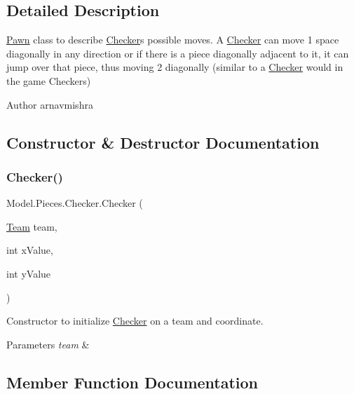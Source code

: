 \subsection{Detailed Description}
\hyperlink{class_model_1_1_pieces_1_1_pawn}{Pawn} class to describe \hyperlink{class_model_1_1_pieces_1_1_checker}{Checker}\textquotesingle{}s possible moves. A \hyperlink{class_model_1_1_pieces_1_1_checker}{Checker} can move 1 space diagonally in any direction or if there is a piece diagonally adjacent to it, it can jump over that piece, thus moving 2 diagonally (similar to a \hyperlink{class_model_1_1_pieces_1_1_checker}{Checker} would in the game Checkers) \begin{DoxyAuthor}{Author}
arnavmishra 
\end{DoxyAuthor}


\subsection{Constructor \& Destructor Documentation}
\hypertarget{class_model_1_1_pieces_1_1_checker_af2b456d3e6c3ceff5a641fac1928fd5a}{}\label{class_model_1_1_pieces_1_1_checker_af2b456d3e6c3ceff5a641fac1928fd5a} 
\subsubsection{\texorpdfstring{Checker()}{Checker()}}
{\footnotesize\ttfamily Model.\+Pieces.\+Checker.\+Checker (\begin{DoxyParamCaption}\item[{\hyperlink{class_model_1_1_team}{Team}}]{team,  }\item[{int}]{x\+Value,  }\item[{int}]{y\+Value }\end{DoxyParamCaption})}

Constructor to initialize \hyperlink{class_model_1_1_pieces_1_1_checker}{Checker} on a team and coordinate. 
\begin{DoxyParams}{Parameters}
{\em team} & \\
\hline
\end{DoxyParams}


\subsection{Member Function Documentation}
\hypertarget{class_model_1_1_pieces_1_1_checker_ada084337407a5dc86bee162d61de44a8}{}\label{class_model_1_1_pieces_1_1_checker_ada084337407a5dc86bee162d61de44a8} 
